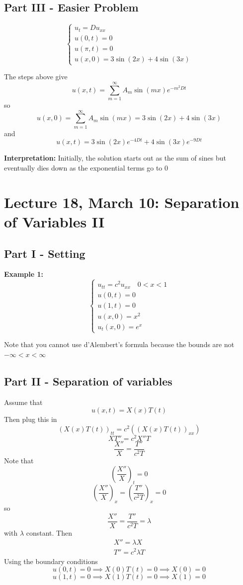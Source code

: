 \documentclass[12pt]{article}
\begin{document}
\subsection*{Part III - Easier Problem}
\[\begin{cases}
    u_t = Du_{xx}\\
    u(0, t) = 0\\
    u(\pi, t) = 0\\
    u(x, 0) = 3\sin(2x) + 4\sin(3x)
\end{cases}\]

The steps above give 
\[u(x, t) = \sum_{ m=1}^\infty A_m \sin(mx)e^{-m^2Dt}\] 
so 
\[u(x, 0) = \sum_{ m=1}^\infty A_m \sin(mx) = 3\sin(2x) + 4\sin(3x)\]
and 
\[\boxed{u(x, t) = 3\sin(2x)e^{-4Dt} + 4\sin(3x)e^{-9Dt}}\]

\textbf{Interpretation:} Initially, the solution starts out as the sum of sines but eventually dies down as the exponential terms go to 0

\section*{Lecture 18, March 10: Separation of Variables II}
\subsection*{Part I - Setting}
\textbf{Example 1:}
\[\begin{cases}
    u_{tt} = c^2 u_{xx} \quad 0 < x < 1\\
    u(0, t) = 0\\
    u(1, t) = 0\\
    u(x, 0) = x^2\\
    u_t(x, 0) = e^x
\end{cases}\] 

Note that you cannot use d'Alembert's formula because the bounds are not $-\infty < x < \infty$

\subsection*{Part II - Separation of variables}
Assume that 
\[u(x, t) = X(x) T(t)\]
Then plug this in 
\[(X(x)T(t))_{tt} = c^2((X(x)T(t))_{xx})\]
\[XT'' = c^2X''T\]
\[\frac{X''}{X} =  \frac{T''}{c^2T}\]
Note that 
\[\left(\frac{X''}{X}\right)_t = 0\]
\[\left(\frac{X''}{X}\right)_x = \left(\frac{T''}{c^2T}\right)_x = 0\]
so 
\[\frac{X''}{X} =  \frac{T''}{c^2T} = \lambda\]
with $\lambda$ constant. Then 
\begin{align*}
    X'' = \lambda X\\
    T'' = c^2\lambda T
\end{align*}
Using the boundary conditions
\[u(0, t) = 0 \implies X(0)T(t)= 0 \implies X(0) = 0\]
\[u(1, t) = 0 \implies X(1)T(t)= 0 \implies X(1) = 0\]
\end{document}
